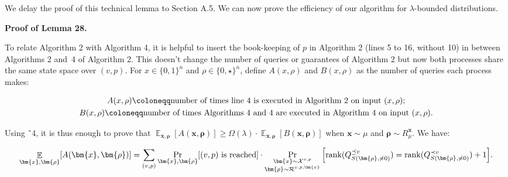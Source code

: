 \documentclass[10pt,a4paper]{article}
\begin{document}



We delay the proof of this technical lemma to Section A.5. We can now prove the efficiency of our algorithm for $\lambda$-bounded distributions.\par




\par\medskip\noindent\textbf{Proof of Lemma 28.}\par




To relate Algorithm 2 with Algorithm 4, it is helpful to insert the book-keeping of $p$ in Algorithm 2 (lines 5 to 16, without 10) in between Algorithms 2 and 4 of Algorithm 2. This doesn’t change the number of queries or guarantees of Algorithm 2 but now both processes share the same state space over $(v,p)$. For $x\in\{0,1\}^{n}$ and $\rho\in\{0,\star\}^{n}$, define $A(x,\rho)$ and $B(x,\rho)$ as the number of queries each process makes:\par




\[\begin{gathered}
\displaystyle A(x,\rho) \displaystyle\coloneqq\text{number of times line\nobreak\ 4 is executed in Algorithm 2 on input $(x,\rho)$}; \\
\displaystyle B(x,\rho) \displaystyle\coloneqq\text{number of times Algorithms 4 and\nobreakspace4 are executed in Algorithm 4 on input $(x,\rho)$}.
\end{gathered}\]


Using ˜4, it is thus enough to prove that $\mathop{\mathbb{E}}_{\bm{x},\bm{\rho}}\left[A(\bm{x},\bm{\rho})\right]\geq\Omega(\lambda)\cdot\mathop{\mathbb{E}}_{\bm{x},\bm{\rho}}\left[B(\bm{x},\bm{\rho})\right]$ when $\bm{x}\sim\mu$ and $\bm{\rho}\sim R_{\mu}^{\bm{x}}$. We have:\par


\[\begin{gathered}
\mathop{\mathbb{E}}_{\bm{x},\bm{\rho}}[A(\bm{x},\bm{\rho})]=\sum_{(v,p)}\Pr_{\bm{x},\bm{\rho}}[\text{$(v,p)$ is reached}]\cdot\Pr_{\begin{subarray}{c}\bm{x}\sim\mathcal{X}^{v,p}\\
\bm{\rho}\sim\mathcal{R}^{v,p,\bm{x}}\end{subarray}}\Big{[}\mathrm{rank}(Q^{\preceq v}_{S(\bm{\rho},\neq 0)})=\mathrm{rank}(Q^{\prec v}_{S(\bm{\rho},\neq 0)})+1\Big{]}.
\end{gathered}\]
\end{document}
